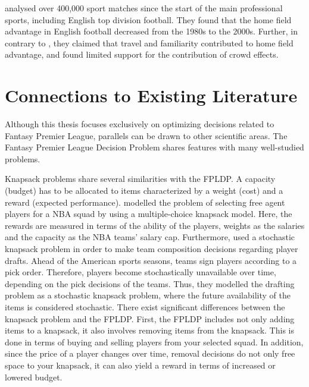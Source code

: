\newpar

\cite{Pollard} analysed over 400,000 sport matches since the start of the main professional sports, including English top division football. They found that the home field advantage in English football decreased from the 1980s to the 2000s. Further, in contrary to \cite{Nevill}, they claimed that travel and familiarity contributed to home field advantage, and found limited support for the contribution of crowd effects. %



\section{Connections to Existing Literature}\label{Other_Relevant_Research}

Although this thesis focuses exclusively on optimizing decisions related to Fantasy Premier League, parallels can be drawn to other scientific areas. The Fantasy Premier League Decision Problem shares features with many well-studied problems.  

\newpar

Knapsack problems share several similarities with the FPLDP. A capacity (budget) has to be allocated to items characterized by a weight (cost) and a reward (expected performance). \cite{Kirshner} modelled the problem of selecting free agent players for a NBA squad by using a multiple-choice knapsack model. Here, the rewards are measured in terms of the ability of the players, weights as the salaries and the capacity as the NBA teams' salary cap. Furthermore, \cite{Gibson} used a stochastic knapsack problem in order to make team composition decisions regarding player drafts. Ahead of the American sports seasons, teams sign players according to a pick order. Therefore, players become stochastically unavailable over time, depending on the pick decisions of the teams. Thus, they modelled the drafting problem as a stochastic knapsack problem, where the future availability of the items is considered stochastic. There exist significant differences between the knapsack problem and the FPLDP. First, the FPLDP includes not only adding items to a knapsack, it also involves removing items from the knapsack. This is done in terms of buying and selling players from your selected squad. In addition, since the price of a player changes over time, removal decisions do not only free space to your knapsack, it can also yield a reward in terms of increased or lowered budget. 

